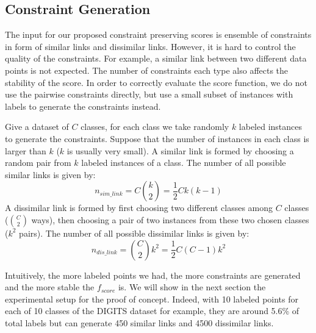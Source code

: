 \subsection{Constraint Generation}

The input for our proposed constraint preserving scores is ensemble of constraints in form of similar links and dissimilar links.
However, it is hard to control the quality of the constraints.
For example, a similar link between two different data points is not expected.
The number of constraints each type also affects the stability of the score.
In order to correctly evaluate the score function, we do not use the pairwise constraints directly, but use a small subset of instances with labels to generate the constraints instead.

Give a dataset of $C$ classes, for each class we take randomly $k$ labeled instances to generate the constraints.
Suppose that the number of instances in each class is larger than $k$ ($k$ is usually very small).
A similar link is formed by choosing a random pair from $k$ labeled instances of a class.
The number of all possible similar links is given by:
\begin{equation}\label{equ:n-sim-link}
n_{sim\_link} = C {k \choose 2} = \frac{1}{2} C k (k-1)
\end{equation}
A dissimilar link is formed by first choosing two different classes among $C$ classes (${C \choose 2}$ ways),
then choosing a pair of two instances from these two chosen classes ($k^2$ pairs).
The number of all possible dissimilar links is given by:
\begin{equation}\label{equ:n-dis-link}
n_{dis\_link} = {C \choose 2} k^2 = \frac{1}{2} C (C-1) k^2
\end{equation}

Intuitively, the more labeled points we had, the more constraints are generated and the more stable the $f_{score}$ is.
We will show in the next section the experimental setup for the proof of concept.
Indeed, with 10 labeled points for each of 10 classes of the DIGITS dataset for example, they are around 5.6\% of total labels but can generate 450 similar links and 4500 dissimilar links.

